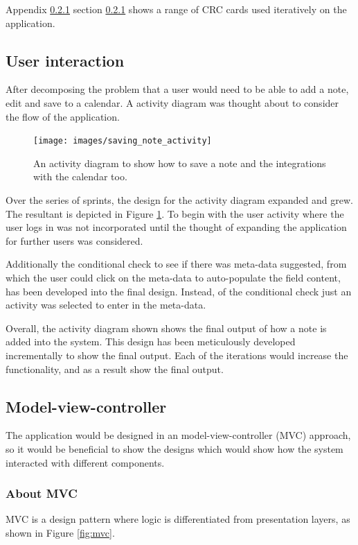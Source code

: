 Appendix \ref{} section \ref{} shows a range of CRC cards used iteratively on the application.


\subsection{User interaction}
After decomposing the problem that a user would need to be able to add a note, edit and save to a calendar. A activity diagram was thought about to consider the flow of the application.

\begin{figure}[H]
  \centering
  \texttt{[image: images/saving\_note\_activity]}
  \caption{An activity diagram to show how to save a note and the integrations with the calendar too.}
  \label{fig:activity_show_note}
\end{figure}

Over the series of sprints, the design for the activity diagram expanded and grew. The resultant is depicted in Figure \ref{fig:activity_show_note}. To begin with the user activity where the user logs in was not incorporated until the thought of expanding the application for further users was considered.

Additionally the conditional check to see if there was meta-data suggested, from which the user could click on the meta-data to auto-populate the field content, has been developed into the final design. Instead, of the conditional check just an activity was selected to enter in the meta-data.

Overall, the activity diagram shown shows the final output of how a note is added into the system. This design has been meticulously developed incrementally to show the final output. Each of the iterations would increase the functionality, and as a result show the final output.

\subsection{Model-view-controller}
The application would be designed in an model-view-controller (MVC) approach, so it would be beneficial to show the designs which would show how the system interacted with different components.

\subsubsection{About MVC}
MVC is a design pattern where logic is differentiated from presentation layers, as shown in Figure \ref{fig:mvc}.

